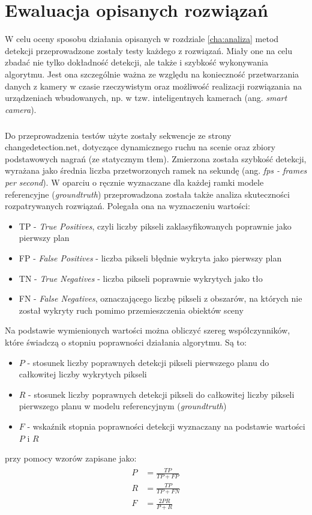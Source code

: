 \chapter{Ewaluacja opisanych rozwiązań}
\label{cha:testy}
\renewcommand{\tablename}{Tabela}

W celu oceny sposobu działania opisanych w rozdziale \ref{cha:analiza} metod detekcji przeprowadzone zostały testy każdego z rozwiązań. Miały one na celu zbadać nie tylko dokładność detekcji, ale także i szybkość wykonywania algorytmu. Jest ona szczególnie ważna ze względu na konieczność przetwarzania danych z kamery w czasie rzeczywistym oraz możliwość realizacji rozwiązania na urządzeniach wbudowanych, np. w tzw. inteligentnych kamerach (ang. \textit{smart camera}). 
\paragraph{}
Do przeprowadzenia testów użyte zostały sekwencje ze strony changedetection.net, dotyczące dynamicznego ruchu na scenie oraz zbiory podstawowych nagrań (ze statycznym tłem). Zmierzona została szybkość detekcji, wyrażana jako średnia liczba przetworzonych ramek na sekundę (ang. \textit{fps - frames per second}). W oparciu o ręcznie wyznaczane dla każdej ramki modele referencyjne (\textit{groundtruth}) przeprowadzona została także analiza skuteczności rozpatrywanych rozwiązań. Polegała ona na wyznaczeniu wartości:
\begin{itemize}
\item TP - \textit{True Positives}, czyli liczby pikseli zaklasyfikowanych poprawnie jako pierwszy plan
\item FP - \textit{False Positives} - liczba pikseli błędnie wykryta jako pierwszy plan
\item TN - \textit{True Negatives} - liczba pikseli poprawnie wykrytych jako tło
\item FN - \textit{False Negatives}, oznaczającego liczbę pikseli z obszarów, na których nie został wykryty ruch pomimo przemieszczenia obiektów sceny
\end{itemize}
Na podstawie wymienionych wartości można obliczyć szereg współczynników, które świadczą o stopniu poprawności działania algorytmu. Są to:
\begin{itemize}
\item $P$ - stosunek liczby poprawnych detekcji pikseli pierwszego planu do całkowitej liczby wykrytych pikseli
\item $R$ -  stosunek liczby poprawnych detekcji pikseli do całkowitej liczby pikseli pierwszego planu w modelu referencyjnym (\textit{groundtruth})
\item $F$ - wskaźnik stopnia poprawności detekcji wyznaczany na podstawie wartości $P$ i $R$
\end{itemize}
przy pomocy wzorów zapisane jako:
\begin{align}
\begin{split}
P &= \frac{TP}{TP+FP} \\
R &= \frac{TP}{TP+FN} \\
F &= \frac{2PR}{P+R}
\end{split}
\end{align}

